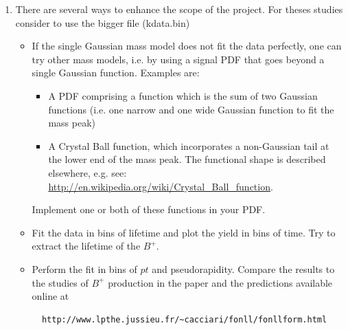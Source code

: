 \begin{enumerate}
\item There are several ways to enhance the scope of the project. For theses studies consider to use the bigger file (kdata.bin)
  \begin{itemize}
\item If the single Gaussian mass model does not fit the data perfectly, one can try other mass models, i.e. by using a signal PDF that goes beyond a single Gaussian function.  Examples are:
\begin{itemize}
\item A PDF comprising a function which is the sum of two Gaussian functions (i.e. one narrow and one wide Gaussian function to fit the mass peak)
\item A Crystal Ball function, which incorporates a non-Gaussian tail at the lower end of the mass peak. The functional shape is described elsewhere, e.g. see: \url{http://en.wikipedia.org/wiki/Crystal_Ball_function}. 
\end{itemize}
Implement one or both of these functions in your PDF.
\item Fit the data in bins of lifetime and plot the yield in bins of time. Try to extract the lifetime of the $B^+$.
\item Perform the fit in bins of $pt$ and pseudorapidity. Compare the results to the studies of $B^+$ production in the paper and the predictions available online at
\begin{verbatim}
  http://www.lpthe.jussieu.fr/~cacciari/fonll/fonllform.html 
\end{verbatim} 

\end{itemize}
\end{enumerate}

 




